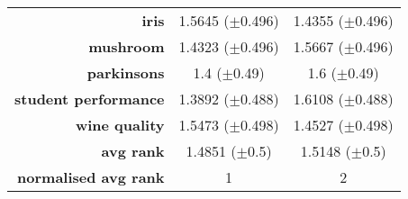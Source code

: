 \begin{table}[htb]
{\begin{tabular}{rcc}
			\multicolumn{1}{r|}{\textbf{iris}}                & \cellcolor[rgb]{ .973,  .412,  .42}1.5645 ($\pm$0.496)    & \cellcolor[rgb]{ .388,  .745,  .482}1.4355 ($\pm$0.496) \\
			\multicolumn{1}{r|}{\textbf{mushroom}}            & \cellcolor[rgb]{ .388,  .745,  .482}1.4323 ($\pm$0.496)   & \cellcolor[rgb]{ .973,  .412,  .42}1.5667 ($\pm$0.496)  \\
			\multicolumn{1}{r|}{\textbf{parkinsons}}          & \cellcolor[rgb]{ .388,  .745,  .482}1.4 ($\pm$0.49)       & \cellcolor[rgb]{ .973,  .412,  .42}1.6 ($\pm$0.49)      \\
			\multicolumn{1}{r|}{\textbf{student performance}} & \cellcolor[rgb]{ .388,  .745,  .482}1.3892 ($\pm$0.488)   & \cellcolor[rgb]{ .973,  .412,  .42}1.6108 ($\pm$0.488)  \\
			\multicolumn{1}{r|}{\textbf{wine quality}}        & \cellcolor[rgb]{ .973,  .412,  .42}1.5473 ($\pm$0.498)    & \cellcolor[rgb]{ .388,  .745,  .482}1.4527 ($\pm$0.498) \\
			\midrule
			\multicolumn{1}{r|}{\textbf{avg rank}}            & \cellcolor[rgb]{ .388,  .745,  .482}1.4851 ($\pm$0.5)     & \cellcolor[rgb]{ .973,  .412,  .42}1.5148 ($\pm$0.5)    \\
			\midrule
			\textbf{normalised avg rank}                      & \cellcolor[rgb]{ .388,  .745,  .482}1                     & \cellcolor[rgb]{ .973,  .412,  .42}2                    \\
		\end{tabular}%

	}
\end{table}%

